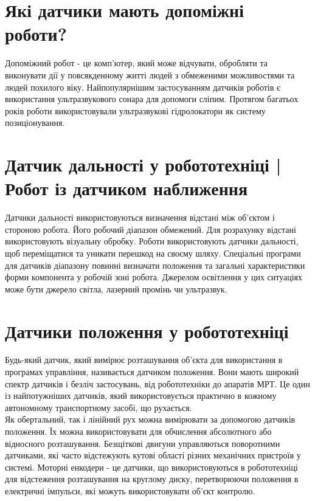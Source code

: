 \documentclass[a4paper,14pt]{extreport}
\begin{document}
\section{Які датчики мають допоміжні роботи?}\par

Допоміжний робот - це комп'ютер, який може відчувати, обробляти та виконувати дії у повсякденному житті людей з обмеженими можливостями та людей похилого віку. Найпопулярнішим застосуванням датчиків роботів є використання ультразвукового сонара для допомоги сліпим. Протягом багатьох років роботи використовували ультразвукові гідролокатори як систему позиціонування.

\section{Датчик дальності у робототехніці | Робот із датчиком наближення}\par

Датчики дальності використовуються визначення відстані між об'єктом і стороною робота. Його робочий діапазон обмежений. Для розрахунку відстані використовують візуальну обробку. Роботи використовують датчики дальності, щоб переміщатися та уникати перешкод на своєму шляху. Спеціальні програми для датчиків діапазону повинні визначати положення та загальні характеристики форми компонента у робочій зоні робота. Джерелом освітлення у цих ситуаціях може бути джерело світла, лазерний промінь чи ультразвук.

\section{Датчики положення у робототехніці}\par

Будь-який датчик, який вимірює розташування об'єкта для використання в програмах управління, називається датчиком положення. Вони мають широкий спектр датчиків і безліч застосувань, від робототехніки до апаратів МРТ. Це один із найпотужніших датчиків, який використовується практично в кожному автономному транспортному засобі, що рухається.\\

Як обертальний, так і лінійний рух можна вимірювати за допомогою датчиків положення. Їх можна використовувати для обчислення абсолютного або відносного розташування. Безщіткові двигуни управляються поворотними датчиками, які часто відстежують кутові області різних механічних пристроїв у системі. Моторні енкодери - це датчики, що використовуються в робототехніці для відстеження розташування на круглому диску, перетворюючи положення в електричні імпульси, які можуть використовувати об'єкт контролю.
\end{document}
